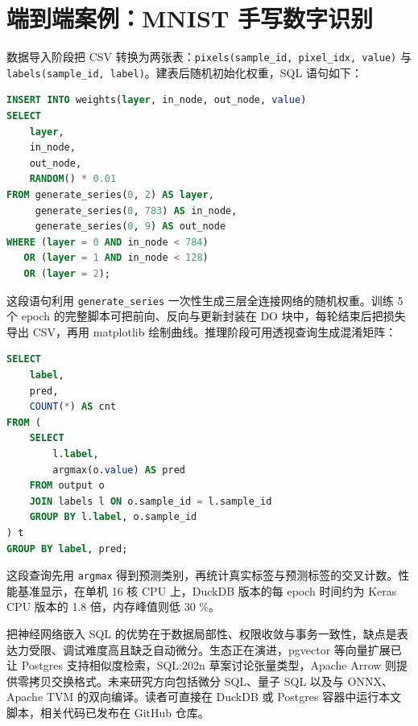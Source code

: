 \chapter{端到端案例：MNIST 手写数字识别}
数据导入阶段把 CSV 转换为两张表：\texttt{pixels(sample\_{}id, pixel\_{}idx, value)} 与 \texttt{labels(sample\_{}id, label)}。建表后随机初始化权重，SQL 语句如下：\par
\begin{lstlisting}[language=sql]
INSERT INTO weights(layer, in_node, out_node, value)
SELECT 
    layer,
    in_node,
    out_node,
    RANDOM() * 0.01
FROM generate_series(0, 2) AS layer,
     generate_series(0, 783) AS in_node,
     generate_series(0, 9) AS out_node
WHERE (layer = 0 AND in_node < 784) 
   OR (layer = 1 AND in_node < 128) 
   OR (layer = 2);
\end{lstlisting}
这段语句利用 \texttt{generate\_{}series} 一次性生成三层全连接网络的随机权重。训练 5 个 epoch 的完整脚本可把前向、反向与更新封装在 DO 块中，每轮结束后把损失导出 CSV，再用 matplotlib 绘制曲线。推理阶段可用透视查询生成混淆矩阵：\par
\begin{lstlisting}[language=sql]
SELECT 
    label,
    pred,
    COUNT(*) AS cnt
FROM (
    SELECT 
        l.label,
        argmax(o.value) AS pred
    FROM output o
    JOIN labels l ON o.sample_id = l.sample_id
    GROUP BY l.label, o.sample_id
) t
GROUP BY label, pred;
\end{lstlisting}
这段查询先用 \texttt{argmax} 得到预测类别，再统计真实标签与预测标签的交叉计数。性能基准显示，在单机 16 核 CPU 上，DuckDB 版本的每 epoch 时间约为 Keras CPU 版本的 1.8 倍，内存峰值则低 30 \%{}。\par
把神经网络嵌入 SQL 的优势在于数据局部性、权限收敛与事务一致性，缺点是表达力受限、调试难度高且缺乏自动微分。生态正在演进，pgvector 等向量扩展已让 Postgres 支持相似度检索，SQL:202n 草案讨论张量类型，Apache Arrow 则提供零拷贝交换格式。未来研究方向包括微分 SQL、量子 SQL 以及与 ONNX、Apache TVM 的双向编译。读者可直接在 DuckDB 或 Postgres 容器中运行本文脚本，相关代码已发布在 GitHub 仓库。\par
